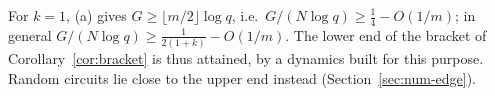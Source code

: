 For $k=1$, (a) gives $G\ge\lfloor m/2\rfloor\log q$, i.e.\ $G/(N\log q)\ge\frac14-O(1/m)$; in general $G/(N\log q)\ge\frac{1}{2(1+k)}-O(1/m)$. The lower end of the bracket of Corollary~\ref{cor:bracket} is thus attained, by a dynamics built for this purpose. Random circuits lie close to the upper end instead (Section~\ref{sec:num-edge}).
